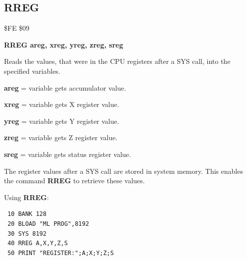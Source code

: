 
\newpage
\subsection{RREG}
\begin{description}[leftmargin=2cm,style=nextline]
\item [Token:] \$FE \$09
\item [Format:] {\bf RREG areg, xreg, yreg, zreg, sreg}
\item [Usage:] Reads the values, that were in the CPU registers
               after a SYS call, into the specified variables.

               {\bf areg} = variable gets accumulator value.

               {\bf xreg} = variable gets X register value.

               {\bf yreg} = variable gets Y register value.

               {\bf zreg} = variable gets Z register value.

               {\bf sreg} = variable gets status register value.

\item [Remarks:] The register values after a SYS call are stored
                 in system memory. This enables the command
                 {\bf RREG} to retrieve these values.

\item [Example:] Using {\bf RREG}:
\begin{tcolorbox}[colback=black,coltext=white]
\verbatimfont{\codefont}
\begin{verbatim}
 10 BANK 128
 20 BLOAD "ML PROG",8192
 30 SYS 8192
 40 RREG A,X,Y,Z,S
 50 PRINT "REGISTER:";A;X;Y;Z;S
\end{verbatim}
\end{tcolorbox}
\end{description}


\newpage
